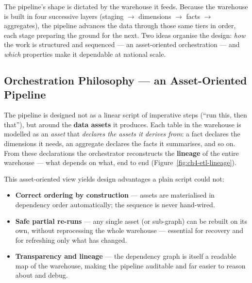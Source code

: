The pipeline's shape is dictated by the warehouse it feeds. Because the warehouse is built in four
successive layers (staging $\rightarrow$ dimensions $\rightarrow$ facts $\rightarrow$ aggregates), the
pipeline advances the data through those same tiers in order, each stage preparing the ground for the
next. Two ideas organise the design: \emph{how} the work is structured and sequenced --- an
asset-oriented orchestration --- and \emph{which} properties make it dependable at national scale.

\subsection{Orchestration Philosophy --- an Asset-Oriented Pipeline}

The pipeline is designed not as a linear script of imperative steps (``run this, then that''), but
around the \textbf{data assets} it produces. Each table in the warehouse is modelled as an
\emph{asset} that \emph{declares the assets it derives from}: a fact declares the dimensions it needs,
an aggregate declares the facts it summarises, and so on. From these declarations the orchestrator
reconstructs the \textbf{lineage} of the entire warehouse --- what depends on what, end to end
(Figure~\ref{fig:ch4-etl-lineage}).

This asset-oriented view yields design advantages a plain script could not:

\begin{itemize}[noitemsep]
    \item \textbf{Correct ordering by construction} --- assets are materialised in dependency order
          automatically; the sequence is never hand-wired.
    \item \textbf{Safe partial re-runs} --- any single asset (or sub-graph) can be rebuilt on its own,
          without reprocessing the whole warehouse --- essential for recovery and for refreshing only
          what has changed.
    \item \textbf{Transparency and lineage} --- the dependency graph is itself a readable map of the
          warehouse, making the pipeline auditable and far easier to reason about and debug.
\end{itemize}


